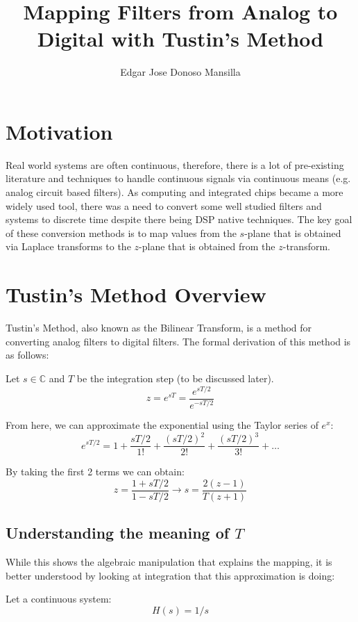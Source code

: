 \documentclass{article}
\begin{document}
\title{Mapping Filters from Analog to Digital with Tustin's Method}
\author{Edgar Jose Donoso Mansilla}
\date{}
\maketitle


\section{Motivation}
Real world systems are often continuous, therefore, there is a lot of pre-existing
literature and techniques to handle continuous signals via continuous means
(e.g. analog circuit based filters). As computing and integrated chips became
a more widely used tool, there was a need to convert some well studied filters
and systems to discrete time despite there being DSP native techniques. The key
goal of these conversion methods is to map values from the $s$-plane that is obtained
via Laplace transforms to the $z$-plane that is obtained from the $z$-transform.

\section{Tustin's Method Overview}
Tustin's Method, also known as the Bilinear Transform, is a method for converting
analog filters to digital filters. The formal derivation of this method is as
follows:

Let $s \in \mathbb C$ and $T$ be the integration step (to be discussed later).
$$
	z = e^{sT} = \frac{e^{sT/2}}{e^{-sT/2}}
$$

From here, we can approximate the exponential using the Taylor series of $e^x$:
$$
	e^{sT/2} = 1 + \frac{sT/2}{1!} + \frac{(sT/2)^2}{2!} + \frac{(sT/2)^3}{3!} + \dots
$$

By taking the first 2 terms we can obtain:
$$
	z = \frac{1 + sT/2}{1 - sT/2} \rightarrow s = \frac{2(z - 1)}{T(z + 1)}
$$

\subsection{Understanding the meaning of $T$}
While this shows the algebraic manipulation that explains the mapping, it is
better understood by looking at integration that this approximation is doing:

Let a continuous system:
$$
	H(s) = 1/s
$$
\end{document}
